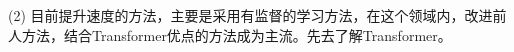 \documentclass[letterpaper,12pt]{article}
\begin{document}
	(2) 目前提升速度的方法，主要是采用有监督的学习方法，在这个领域内，改进前人方法，结合Transformer优点的方法成为主流。先去了解Transformer。
	
	
	
\end{document}
